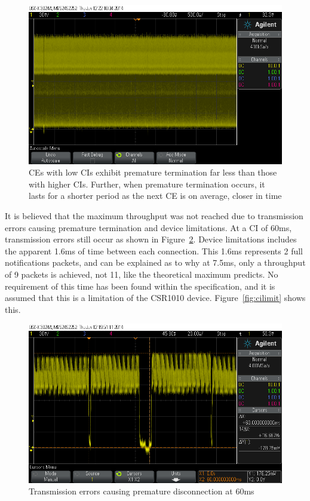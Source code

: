 \documentclass[]{article}
\begin{document}
\begin{figure}[H]
	\begin{center}
		\includegraphics[width = \textwidth]{lowcierrors}
	\end{center}
	\caption{\ac{CE}s with low \ac{CI}s exhibit premature termination far less than those with higher \ac{CI}s. Further, when premature termination occurs, it lasts for a shorter period as the next \ac{CE} is on average, closer in time}
	\label{fig:lowcierrors}
\end{figure}



It is believed that the maximum throughput was not reached due to transmission errors causing premature termination and device limitations. At a \ac{CI} of 60ms, transmission errors still occur as shown in Figure~\ref{fig:60ci}. Device limitations includes the apparent 1.6ms of time between each connection. This 1.6ms represents 2 full notifications packets, and can be explained as to why at 7.5ms, only a throughput of 9 packets is achieved, not 11, like the theoretical maximum predicts. No requirement of this time has been found within the specification, and it is assumed that this is a limitation of the CSR1010 device. Figure~\ref{fig:cilimit} shows this. 

\begin{figure}[H]
	\begin{center}
		\includegraphics[width = \textwidth]{60ci}
	\end{center}
	\caption{Transmission errors causing premature disconnection at 60ms}
	\label{fig:60ci}
\end{figure}
\end{document}
